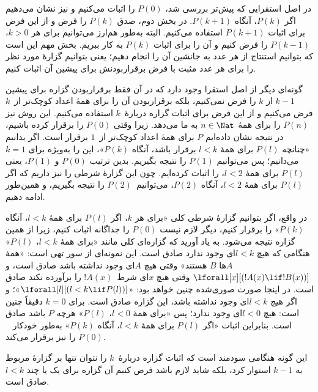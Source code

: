 \documentclass[../../../include/open-logic-section]{subfiles}
\begin{document}


در اصل استقرایی که پیش‌تر بررسی شد، $P(0)$ را اثبات می‌کنیم و نیز
نشان می‌دهیم اگر $P(k)$، آنگاه $P(k+1)$. در بخش دوم، صدق $P(k)$ را
فرض و از این فرض برای اثبات $P(k+1)$ استفاده می‌کنیم. البته به‌طور
هم‌ارز می‌توانیم برای هر $k>0$، $P(k-1)$ را فرض کنیم و آن را برای
اثبات $P(k)$ به کار ببریم. بخش مهم این است که بتوانیم استنتاج از هر
عدد به جانشین آن را انجام دهیم؛ یعنی بتوانیم گزارهٔ مورد نظر را برای
هر عدد مثبت با فرض برقرار‌بودنش برای پیشین آن اثبات کنیم.

گونه‌ای دیگر از اصل استقرا وجود دارد که در آن فقط برقرار‌بودن گزاره
برای پیشین $k-1$ از $k$ را فرض نمی‌کنیم، بلکه برقرار‌بودن آن را برای
همهٔ اعداد کوچک‌تر از~$k$ فرض می‌کنیم و از این فرض برای اثبات گزاره
دربارهٔ~$k$ استفاده می‌کنیم. این روش نیز $P(n)$ را برای همهٔ
$n \in \Nat$ به ما می‌دهد. زیرا وقتی $P(0)$ را برقرار کرده باشیم،
در نتیجه نشان داده‌ایم $P$ برای همهٔ اعداد کوچک‌تر از~$1$ برقرار است.
اگر بدانیم «چنانچه $P(l)$ برای همهٔ $l<k$ برقرار باشد، آنگاه $P(k)$»،
این را به‌ویژه برای $k=1$ می‌دانیم؛ پس می‌توانیم $P(1)$ را نتیجه
بگیریم. بدین ترتیب $P(0)$ و $P(1)$، یعنی $P(l)$ برای همهٔ $l<2$، را
اثبات کرده‌ایم. چون این گزارهٔ شرطی را نیز داریم که اگر $P(l)$ برای
همهٔ $l<2$، آنگاه $P(2)$، می‌توانیم~$P(2)$ را نتیجه بگیریم، و
همین‌طور ادامه دهیم.

در واقع، اگر بتوانیم گزارهٔ شرطی کلی «برای هر $k$، اگر $P(l)$ برای
همهٔ $l<k$، آنگاه $P(k)$» را برقرار کنیم، دیگر لازم نیست $P(0)$ را
جداگانه اثبات کنیم، زیرا از همین گزاره نتیجه می‌شود. به یاد آورید که
گزاره‌ای کلی مانند «برای همهٔ $l<k$، $P(l)$» هنگامی که هیچ $l<k$ای
وجود ندارد صادق است. این نمونه‌ای از سور تهی است: «همهٔ $A$ها $B$
هستند» وقتی هیچ $A$ای وجود نداشته باشد صادق است، و
$\lforall[x][(!A(x) \lif !B(x))]$ وقتی هیچ $x$ای شرط~$!A(x)$ را برآورده
نکند صادق است. در اینجا صورت صوری‌شده چنین خواهد بود:
«$\lforall[l][(l < k \lif P(l))]$»؛ و اگر هیچ $l < k$ای وجود نداشته
باشد، این گزاره صادق است. برای $k=0$ دقیقاً چنین است: هیچ $l<0$ای وجود
ندارد؛ پس «برای همهٔ $l<0$، $P(l)$» هرچه $P$ باشد صادق است. بنابراین
اثبات «اگر $P(l)$ برای همهٔ $l<k$، آنگاه $P(k)$» به‌طور خودکار
~$P(0)$ را نیز برقرار می‌کند.

این گونه هنگامی سودمند است که اثبات گزاره دربارهٔ~$k$ را نتوان تنها
بر گزارهٔ مربوط به $k-1$ استوار کرد، بلکه شاید لازم باشد فرض کنیم آن
گزاره برای یک یا چند $l<k$ صادق است.
\end{document}
